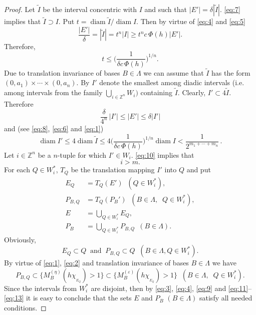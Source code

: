 \documentclass[12pt,reqno]{article}
\theoremstyle{remark}
\newcommand{\diam}{\operatorname{diam}}
\begin{document}
\begin{proof}
Let $\widetilde{I}$ be the interval concentric with $I$ and such that $|E'|=\delta|\widetilde{I}|$. \eqref{eq:7} implies that $\widetilde{I}\supset I$. Put $t=\diam\widetilde{I}/\diam I$. Then by virtue of \eqref{eq:4} and \eqref{eq:5}
$$  \frac{|E'|}{\delta}=|\widetilde{I}|=t^n|I|\geq t^nc\,\Phi(h)|E'|.       $$
Therefore,
\begin{equation}\label{eq:8}
    t\leq\Big(\frac{1}{\delta c\,\Phi(h)}\Big)^{1/n}.
\end{equation}
Due to translation invariance of bases $B\in\Lambda$ we can assume that $\widetilde{I}$ has the form $(0,a_1)\times\cdots\times(0,a_n)$. By $I'$ denote the smallest among diadic intervals (i.e. among intervals from the family $\bigcup\limits_{i\in\mathbb{Z}^n} W_i)$ containing $\widetilde{I}$. Clearly, $I'\subset 4\widetilde{I}$. Therefore
\begin{equation}\label{eq:9}
    \frac{\delta}{4^n}\,|I'|\leq |E'|\leq\delta|I'|
\end{equation}
and (see \eqref{eq:8}, \eqref{eq:6} and \eqref{eq:1})
\begin{equation}\label{eq:10}
    \diam I'\leq 4\diam\widetilde{I}\leq 4\Big(\frac{1}{\delta c\,\Phi(h)}\Big)^{1/n}\diam I<\frac{1}{2^{m_1+\cdots+m_n}}\,.
\end{equation}
Let $i\in\mathbb{Z}^n$ be a $n$-tuple for which  $I'\in W_i$. \eqref{eq:10} implies that
\begin{equation}\label{eq:11}
    i>m.
\end{equation}
For each $Q\in W_i^{*}$, $T_Q$ be the translation mapping $I'$ into $Q$ and put
\begin{align*}
    E_Q & =T_Q(E') \;\; (Q\in W_i^{*}), \\
    P_{B,Q} & =T_Q(P_B') \;\; (B\in\Lambda, \;\; Q\in W_i^{*}), \\
    E & =\bigcup_{Q\in W_i^{*}} E_Q, \\
    P_B & =\bigcup_{Q\in W_i^{*}} P_{B,Q} \;\ (B\in\Lambda).
\end{align*}
Obviously,
\begin{equation}\label{eq:12}
    E_Q\subset Q \;\;\text{and}\;\; P_{B,Q}\subset Q \;\; (B\in\Lambda, Q\in W_i^{*}).
\end{equation}
By virtue of \eqref{eq:1}, \eqref{eq:2} and translation invariance of bases $B\in\Lambda$ we have
\begin{equation}\label{eq:13}
    P_{B,Q}\subset \big\{M_B^{(\eta)}(h\chi_{{}_{E_Q}})>1\big\}\subset\big\{M_B^{(\varepsilon)}(h\chi_{{}_{E_Q}})>1\big\} \;\;
            (B\in\Lambda, \;\; Q\in W_i^{*}).
\end{equation}
Since the intervals from $W_i^{*}$ are disjoint, then by \eqref{eq:3}, \eqref{eq:4}, \eqref{eq:9} and \eqref{eq:11}--\eqref{eq:13} it is easy to conclude that the sets $E$ and $P_B$ $(B\in\Lambda)$ satisfy all needed conditions.
\end{proof}
\end{document}
